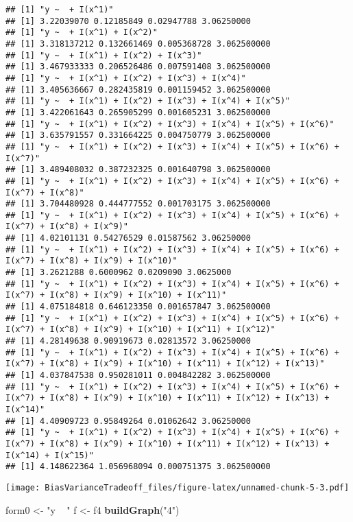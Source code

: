 \documentclass[]{article}
\newenvironment{Shaded}{\begin{snugshade}}{\end{snugshade}}
\newcommand{\KeywordTok}[1]{\textcolor[rgb]{0.13,0.29,0.53}{\textbf{#1}}}
\newcommand{\NormalTok}[1]{#1}
\newcommand{\StringTok}[1]{\textcolor[rgb]{0.31,0.60,0.02}{#1}}
\begin{document}
\begin{verbatim}
## [1] "y ~  + I(x^1)"
## [1] 3.22039070 0.12185849 0.02947788 3.06250000
## [1] "y ~  + I(x^1) + I(x^2)"
## [1] 3.318137212 0.132661469 0.005368728 3.062500000
## [1] "y ~  + I(x^1) + I(x^2) + I(x^3)"
## [1] 3.467933333 0.206526486 0.007591408 3.062500000
## [1] "y ~  + I(x^1) + I(x^2) + I(x^3) + I(x^4)"
## [1] 3.405636667 0.282435819 0.001159452 3.062500000
## [1] "y ~  + I(x^1) + I(x^2) + I(x^3) + I(x^4) + I(x^5)"
## [1] 3.422061643 0.265905299 0.001605231 3.062500000
## [1] "y ~  + I(x^1) + I(x^2) + I(x^3) + I(x^4) + I(x^5) + I(x^6)"
## [1] 3.635791557 0.331664225 0.004750779 3.062500000
## [1] "y ~  + I(x^1) + I(x^2) + I(x^3) + I(x^4) + I(x^5) + I(x^6) + I(x^7)"
## [1] 3.489408032 0.387232325 0.001640798 3.062500000
## [1] "y ~  + I(x^1) + I(x^2) + I(x^3) + I(x^4) + I(x^5) + I(x^6) + I(x^7) + I(x^8)"
## [1] 3.704480928 0.444777552 0.001703175 3.062500000
## [1] "y ~  + I(x^1) + I(x^2) + I(x^3) + I(x^4) + I(x^5) + I(x^6) + I(x^7) + I(x^8) + I(x^9)"
## [1] 4.02101131 0.54276529 0.01587562 3.06250000
## [1] "y ~  + I(x^1) + I(x^2) + I(x^3) + I(x^4) + I(x^5) + I(x^6) + I(x^7) + I(x^8) + I(x^9) + I(x^10)"
## [1] 3.2621288 0.6000962 0.0209090 3.0625000
## [1] "y ~  + I(x^1) + I(x^2) + I(x^3) + I(x^4) + I(x^5) + I(x^6) + I(x^7) + I(x^8) + I(x^9) + I(x^10) + I(x^11)"
## [1] 4.075184818 0.646123350 0.001657847 3.062500000
## [1] "y ~  + I(x^1) + I(x^2) + I(x^3) + I(x^4) + I(x^5) + I(x^6) + I(x^7) + I(x^8) + I(x^9) + I(x^10) + I(x^11) + I(x^12)"
## [1] 4.28149638 0.90919673 0.02813572 3.06250000
## [1] "y ~  + I(x^1) + I(x^2) + I(x^3) + I(x^4) + I(x^5) + I(x^6) + I(x^7) + I(x^8) + I(x^9) + I(x^10) + I(x^11) + I(x^12) + I(x^13)"
## [1] 4.037847538 0.950281011 0.004842282 3.062500000
## [1] "y ~  + I(x^1) + I(x^2) + I(x^3) + I(x^4) + I(x^5) + I(x^6) + I(x^7) + I(x^8) + I(x^9) + I(x^10) + I(x^11) + I(x^12) + I(x^13) + I(x^14)"
## [1] 4.40909723 0.95849264 0.01062642 3.06250000
## [1] "y ~  + I(x^1) + I(x^2) + I(x^3) + I(x^4) + I(x^5) + I(x^6) + I(x^7) + I(x^8) + I(x^9) + I(x^10) + I(x^11) + I(x^12) + I(x^13) + I(x^14) + I(x^15)"
## [1] 4.148622364 1.056968094 0.000751375 3.062500000
\end{verbatim}

\texttt{[image: BiasVarianceTradeoff\_files/figure-latex/unnamed-chunk-5-3.pdf]}

\begin{Shaded}
\begin{Highlighting}[]
\NormalTok{form0 <-}\StringTok{ "y ~ "}
\NormalTok{f <-}\StringTok{ }\NormalTok{f4}
\KeywordTok{buildGraph}\NormalTok{(}\StringTok{"4"}\NormalTok{)}
\end{Highlighting}
\end{Shaded}
\end{document}
